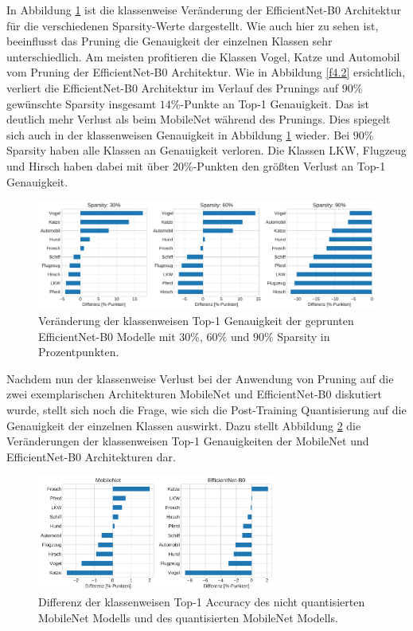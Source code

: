 In Abbildung \ref{f4.7} ist die klassenweise Veränderung der EfficientNet-B0 Architektur für die verschiedenen Sparsity-Werte dargestellt. Wie auch hier zu sehen ist, beeinflusst das Pruning die Genauigkeit der einzelnen Klassen sehr unterschiedlich. Am meisten profitieren die Klassen Vogel, Katze und Automobil vom Pruning der EfficientNet-B0 Architektur. Wie in Abbildung \ref{f4.2} ersichtlich, verliert die EfficientNet-B0 Architektur im Verlauf des Prunings auf $90\%$ gewünschte Sparsity insgesamt $14\%$-Punkte an Top-1 Genauigkeit. Das ist deutlich mehr Verlust als beim MobileNet während des Prunings. Dies spiegelt sich auch in der klassenweisen Genauigkeit in Abbildung \ref{f4.7} wieder. Bei $90\%$ Sparsity haben alle Klassen an Genauigkeit verloren. Die Klassen LKW, Flugzeug und Hirsch haben dabei mit über $20\%$-Punkten den größten Verlust an Top-1 Genauigkeit.

\begin{figure}[htbp]
\centerline{\includegraphics[width=\textwidth]{content/images/classwise_acc_change_pruning_efficientnet-b0.pdf}}
\caption{Veränderung der klassenweisen Top-1 Genauigkeit der geprunten EfficientNet-B0 Modelle mit $30\%$, $60\%$ und $90\%$ Sparsity in Prozentpunkten.}
\label{f4.7}
\end{figure}

Nachdem nun der klassenweise Verlust bei der Anwendung von Pruning auf die zwei exemplarischen Architekturen MobileNet und EfficientNet-B0 diskutiert wurde, stellt sich noch die Frage, wie sich die Post-Training Quantisierung auf die Genauigkeit der einzelnen Klassen auswirkt. Dazu stellt Abbildung \ref{f4.8} die Veränderungen der klassenweisen Top-1 Genauigkeiten der MobileNet und EfficientNet-B0 Architekturen dar.

\begin{figure}[htbp]
\centerline{\includegraphics[width=0.7\textwidth]{content/images/classwise_acc_change_quantization.pdf}}
\caption{Differenz der klassenweisen Top-1 Accuracy des nicht quantisierten MobileNet Modells und des quantisierten MobileNet Modells.}
\label{f4.8}
\end{figure}

